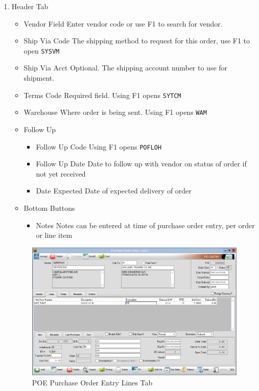 \begin{enumerate}
	\item Header Tab
	\begin{itemize}
		\item Vendor Field \textemdash Enter vendor code or use F1 to search for vendor.
		\item Ship Via Code \textemdash The shipping method to request for this order, use F1 to open \texttt{SYSVM}
		\item Ship Via Acct \textemdash Optional. The shipping account number to use for shipment.
		\item Terms Code \textemdash Required field. Using F1 opens \texttt{SYTCM}
		\item Warehouse \textemdash Where order is being sent. Using F1 opens \texttt{WAM}	
		\item Follow Up
		\begin{itemize}
			\item Follow Up Code \textemdash Using F1 opens \texttt{POFLOH}
			\item Follow Up Date \textemdash Date to follow up with vendor on status of order if not yet received
			\item Date Expected \textemdash Date of expected delivery of order
		\end{itemize}
		\item Bottom Buttons
		\begin{itemize}
			\item Notes \textemdash Notes can be entered at time of purchase order entry, per order or line item
		\end{itemize}
	\end{itemize}
	
	\begin{figure}[H]
		\includegraphics[width=\textwidth]{../img/image98}
		\caption{POE Purchase Order Entry Lines Tab}
	\end{figure}
	

\end{enumerate}
